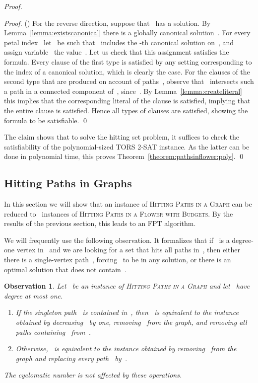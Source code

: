 \let\accentvec\vec  \documentclass{llncs}
\newtheorem{observation}{Observation}
\newcommand{\claimqed}{\renewcommand{\squareforqed}{}\qed\renewcommand{\squareforqed}{\plainsquareforqed}}
\newcommand{\HitPathsInFlower}{\textsc{Hitting Paths in a Flower with Budgets}\xspace}
\newcommand{\HitPathsInGraph}{\textsc{Hitting Paths in a Graph}\xspace}
\newcommand{\TORSTwoSat}{\textsc{TORS 2-SAT}\xspace}
\begin{document}
\begin{proof}
\begin{proof}
() For the reverse direction, suppose that~ has a solution. By Lemma~\ref{lemma:existscanonical} there is a globally canonical solution~. For every petal index~ let~ be such that~ includes the -th canonical solution on~, and assign variable~ the value~. Let us check that this assignment satisfies the formula. Every clause of the first type is satisfied by any setting corresponding to the index of a canonical solution, which is clearly the case. For the clauses of the second type that are produced on account of paths~, observe that~ intersects such a path in a connected component of~, since~. By Lemma~\ref{lemma:createliteral} this implies that the corresponding literal of the clause is satisfied, implying that the entire clause is satisfied. Hence all types of clauses are satisfied, showing the formula to be satisfiable.
\claimqed
\end{proof}

The claim shows that to solve the hitting set problem, it suffices to check the satisfiability of the polynomial-sized \TORSTwoSat instance. As the latter can be done in polynomial time, this proves Theorem~\ref{theorem:pathsinflower:poly}.
\qed
\end{proof}

\subsection{Hitting Paths in Graphs} \label{subsection:hit:paths}

In this section we will show that an instance of \HitPathsInGraph can be reduced to~ instances of \HitPathsInFlower. By the results of the previous section, this leads to an FPT algorithm. 

We will frequently use the following observation. It formalizes that if~ is a degree-one vertex in~ and we are looking for a set that hits all paths in~, then either there is a single-vertex path~, forcing~ to be in any solution, or there is an optimal solution that does not contain~.

\begin{observation} \label{observation:removeleaf}
Let~ be an instance of \HitPathsInGraph and let~ have degree at most one. 
\begin{enumerate}
	\item If the singleton path~ is contained in~, then~ is equivalent to the instance obtained by decreasing~ by one, removing~ from the graph, and removing all paths containing~ from~.
	\item Otherwise,~ is equivalent to the instance obtained by removing~ from the graph and replacing every path~ by~.
\end{enumerate}
The cyclomatic number is not affected by these operations.
\end{observation}
\end{document}
